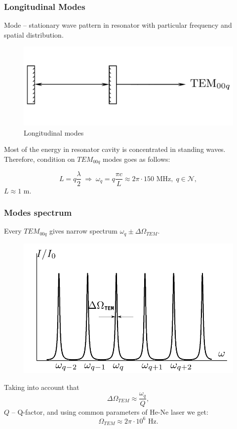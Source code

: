 \documentclass{beamer}
\begin{document}
	\begin{frame}
		\frametitle{Longitudinal Modes}
		Mode -- stationary wave pattern in resonator with particular frequency and spatial distribution.
		
		\begin{figure}
			\includegraphics[width=0.5\linewidth]{res/tem00q.png}
			\caption{Longitudinal modes}
		\end{figure}
		
		Most of the energy in resonator cavity is concentrated in standing waves. Therefore, condition on $TEM_{00q}$ modes goes as follows:
		
		$$ L = q \frac{\lambda}{2} \; \Rightarrow \; \omega_q = q \frac{\pi c}{L} \approx 2 \pi \cdot 150 \text{ MHz}, \; q \in \mathcal{N},$$
		$L \approx 1$ m.
	\end{frame}
	
	\begin{frame}
		\frametitle{Modes spectrum}
		
		Every $TEM_{00q}$ gives narrow spectrum $\omega_q \pm \Delta \Omega_{TEM}$.
		\begin{figure}
			\centering
			\includegraphics[width=0.5\linewidth]{res/tem_spectrum.png}
		\end{figure}
		
		Taking into account that
		$$\Delta \Omega_{TEM} \approx \frac{\omega_q}{Q},$$
		$Q$ -- Q-factor, and using common parameters of He-Ne laser we get:
		$$ \Omega_{TEM} \approx 2 \pi \cdot 10^6 \text{ Hz}.$$
		
	\end{frame}
	
\end{document}
